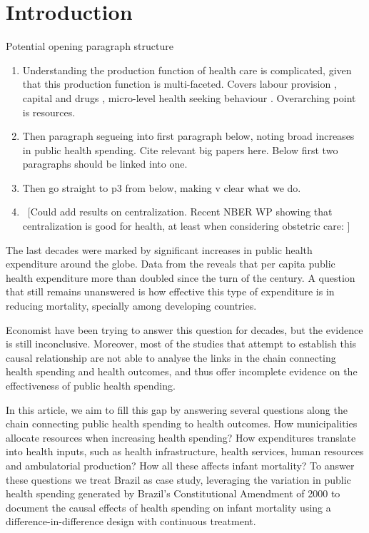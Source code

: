\section{Introduction}\label{sec:intro}
\setcounter{page}{1}

Potential opening paragraph structure
\begin{enumerate}
    \item Understanding the production function of health care is complicated, given that this production function is multi-faceted. Covers labour provision \citep{Custeretal1990}, capital and drugs \citep{Austeretal1969}, micro-level health seeking behaviour \citep{LlerasMuney2005}.  Overarching point is resources.
    \item Then paragraph segueing into first paragraph below, noting broad increases in public health spending.  Cite relevant big papers here.  Below first two paragraphs should be linked into one.
    \item Then go straight to p3 from below, making v clear what we do.
    \item \ [Could add results on centralization.  Recent NBER WP showing that centralization is good for health, at least when considering obstetric care: \citet{Fischeretal2022}]
\end{enumerate}


The last decades were marked by significant increases in public health expenditure around the globe. Data from the \cite{wb} reveals that per capita public health expenditure more than doubled since the turn of the century. A question that still remains unanswered is how effective this type of expenditure is in reducing mortality, specially among developing countries. 

Economist have been trying to answer this question for decades, but the evidence is still inconclusive. Moreover, most of the studies that attempt to establish this causal relationship are not able to analyse the links in the chain connecting health spending and health outcomes, and thus offer incomplete evidence on the effectiveness of public health spending.  

In this article, we aim to fill this gap by answering several questions along the chain connecting public health spending to health outcomes. How municipalities allocate resources when increasing health spending? How expenditures translate into health inputs, such as health infrastructure, health services, human resources and ambulatorial production? How all these affects infant mortality? To answer these questions we treat Brazil as case study, leveraging the variation in public health spending generated by Brazil's  Constitutional Amendment of 2000 to document the causal effects of health spending on infant mortality using a difference-in-difference design with continuous treatment.

